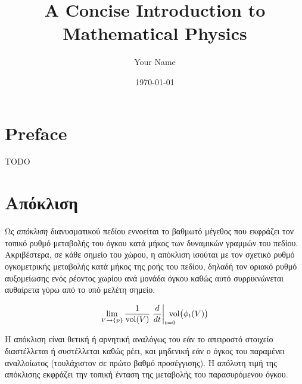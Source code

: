 \documentclass[10pt,a4paper,twoside,openany]{book}
\title{\normalsize\bfseries A Concise Introduction to\\[0.2em] Mathematical Physics}
\author{Your Name}
\date{\today}
\theoremstyle{plain}
\theoremstyle{definition}
\theoremstyle{remark}
\numberwithin{equation}{section}
\begin{document}

\frontmatter
\maketitle
\tableofcontents

\chapter*{Preface}
TODO

\mainmatter

\chapter{Απόκλιση}\label{chapter_divergence}

Ως \textit{απόκλιση} διανυσματικού πεδίου εννοείται το βαθμωτό μέγεθος
που εκφράζει τον τοπικό ρυθμό μεταβολής του όγκου 
κατά μήκος των δυναμικών γραμμών του πεδίου.
Ακριβέστερα, σε κάθε σημείο του χώρου,
η απόκλιση ισούται με τον σχετικό ρυθμό ογκομετρικής μεταβολής
κατά μήκος της ροής του πεδίου,
δηλαδή τον οριακό ρυθμό αυξομείωσης ενός ρέοντος χωρίου ανά μονάδα όγκου
καθώς αυτό συρρικνώνεται αυθαίρετα γύρω από το υπό μελέτη σημείο.

\begin{equation}
\lim_{\substack{V \to \{p\}}}
\frac{1}{\operatorname{vol} (V)}
\left.\frac{d}{dt}\right|_{t=0}
\hspace{-10pt}
\operatorname{vol} \bigl(\phi_t(V)\bigr)
\end{equation}

\noindent
Η απόκλιση είναι θετική ή αρνητική
αναλόγως του εάν το απειροστό στοιχείο διαστέλλεται ή συστέλλεται
καθώς ρέει,
και μηδενική εάν ο όγκος του παραμένει αναλλοίωτος
(τουλάχιστον σε πρώτο βαθμό προσέγγισης).
Η απόλυτη τιμή της απόκλισης εκφράζει την τοπική ένταση
της μεταβολής του παρασυρόμενου όγκου.
\end{document}
